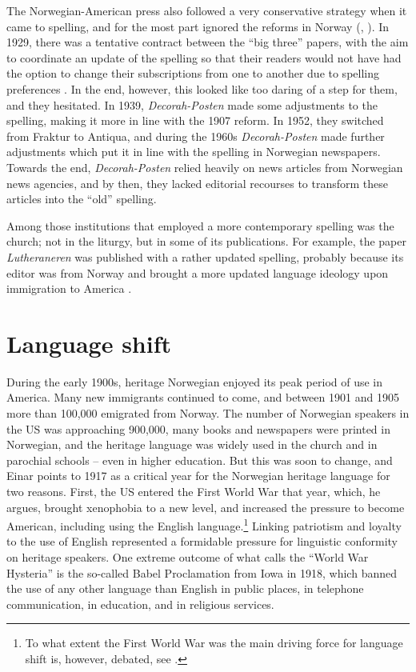 \documentclass[output=paper]{langscibook}
\begin{document}
The Norwegian\hyp American press also followed a very conservative strategy when it came to spelling, and for the most part ignored the reforms in Norway (\citealt{HjeldeJansson2016}, \citealt{Bartásková2017}). In 1929, there was a tentative contract between the “big three” papers, with the aim to coordinate an update of the spelling so that their readers would not have had the option to change their subscriptions from one to another due to spelling preferences \citep[372--373]{Øverland1996}. In the end, however, this looked like too daring of a step for them, and they hesitated. In 1939, \textit{Decorah-Posten} made some adjustments to the spelling, making it more in line with the 1907 reform. In 1952, they switched from Fraktur to Antiqua, and during the 1960s \textit{Decorah-Posten} made further adjustments which put it in line with the spelling in Norwegian newspapers. Towards the end, \textit{Decorah-Posten} relied heavily on news articles from Norwegian news agencies, and by then, they lacked editorial recourses to transform these articles into the “old” spelling. 

Among those institutions that employed a more contemporary spelling was the church; not in the liturgy, but in some of its publications. For example, the paper \textit{Lutheraneren} was published with a rather updated spelling, probably because its editor was from Norway and brought a more updated language ideology upon immigration to America \citep[145--146]{Haugen1953}.

\section{Language shift}\label{sec:hjelde:9}

During the early 1900s, heritage Norwegian enjoyed its peak period of use in America. Many new immigrants continued to come, and between 1901 and 1905 more than 100,000 emigrated from Norway. The number of Norwegian speakers in the US was approaching 900,000, many books and newspapers were printed in Norwegian, and the heritage language was widely used in the church and in parochial schools – even in higher education. But this was soon to change, and Einar \citet[255--258]{Haugen1953} points to 1917 as a critical year for the Norwegian heritage language for two reasons. First, the US entered the First World War that year, which, he argues, brought xenophobia to a new level, and increased the pressure to become American, including using the English language.\footnote{To what extent the First World War was the main driving force for language shift is, however, debated, see \citet{WilkersonSalmons2008,WilkersonSalmons2012}.}  Linking patriotism and loyalty to the use of English represented a formidable pressure for linguistic conformity on heritage speakers. One extreme outcome of what \citet[255]{Haugen1953} calls the “World War Hysteria” is the so-called Babel Proclamation from Iowa in 1918, which banned the use of any other language than English in public places, in telephone communication, in education, and in religious services. 
\end{document}

